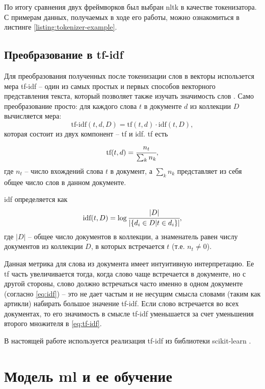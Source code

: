 По итогу сравнения двух фреймворков был выбран \gls{nltk} в качестве токенизатора.
С примерам данных, получаемых в ходе его работы, можно ознакомиться в листинге \ref{listing:tokenizer-example}.
\subsection{Преобразование в \acrshort{tf-idf}}
Для преобразования полученных после токенизации слов в векторы использется мера \acrfull{tf-idf} -- один из самых простых и первых способов векторного представления текста, который позволяет также изучать значимость слов \cite{cite:tf-idf-interpretation}.
Само преобразование просто: для каждого слова $t$ в документе $d$ из коллекции $D$ вычисляется мера:
\begin{equation}
    \label{eq:tf-idf}
    \text{tf-idf} (t, d, D) = \text{tf} (t, d) \cdot \text{idf} (t, D),
\end{equation}
которая состоит из двух компонент -- \acrfull{tf} и \acrfull{idf}.
\acrshort{tf} есть
\begin{equation}
    \label{eq:tf}
    \text{tf} (t, d) = \cfrac{n_t}{\sum_k n_k},
\end{equation}
где $n_t$ -- число вхождений слова $t$ в документ, а $\sum_k n_k$ представляет из себя общее число слов в данном документе.

\acrshort{idf} определяется как
\begin{equation}
    \label{eq:idf}
    \text{idf} (t, D) = \log \cfrac{|D|}{|\{d_i \in D | t \in d_i\}|},
\end{equation}
где $|D|$ -- общее число документов в коллекции, а знаменатель равен числу документов из коллекции $D$, в которых встречается $t$ (т.е. $n_t \neq 0$).

Данная метрика для слова из документа имеет интуитивную интерпретацию.
Ее \acrshort{tf} часть увеличивается тогда, когда слово чаще встречается в документе, но с другой стороны, слово должно встречаться часто именно в одном документе (согласно \eqref{eq:idf}) -- это не дает частым и не несущим смысла словами (таким как артикли) набирать большое значение \acrshort{tf-idf}.
Если слово встречается во всех документах, то его значимость в смысле \acrshort{tf-idf} уменьшается за счет уменьшения второго множителя в \eqref{eq:tf-idf}.

В настоящей работе используется реализация \acrshort{tf-idf} из библиотеки \gls{scikit-learn} \cite{cite:scikit-learn}.
\section{Модель \acrshort{ml} и ее обучение}
\label{sec:training}
